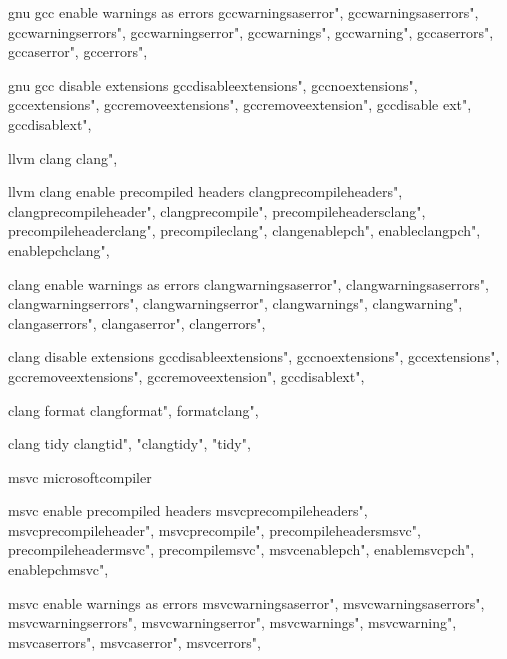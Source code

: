          gnu gcc enable warnings as errors
        gccwarningsaserror", 
        gccwarningsaserrors", 
        gccwarningserrors", 
        gccwarningserror", 
        gccwarnings", 
        gccwarning", 
        gccaserrors", 
        gccaserror", 
        gccerrors", 
        
         gnu gcc disable extensions 
        gccdisableextensions", 
        gccnoextensions", 
        gccextensions", 
        gccremoveextensions", 
        gccremoveextension", 
        gccdisable ext", 
        gccdisablext", 
        
         llvm clang 
        clang",  
        
         llvm clang enable precompiled headers 
        clangprecompileheaders",  
        clangprecompileheader",  
        clangprecompile",  
        precompileheadersclang",  
        precompileheaderclang",  
        precompileclang",  
        clangenablepch",  
        enableclangpch",  
        enablepchclang",  
        
         clang enable warnings as errors
        clangwarningsaserror", 
        clangwarningsaserrors", 
        clangwarningserrors", 
        clangwarningserror", 
        clangwarnings", 
        clangwarning", 
        clangaserrors", 
        clangaserror", 
        clangerrors", 
        
         clang disable extensions 
        gccdisableextensions", 
        gccnoextensions", 
        gccextensions", 
        gccremoveextensions", 
        gccremoveextension", 
        gccdisablext", 
        
         clang format 
        clangformat",
        formatclang",
        
         clang tidy 
        clangtid", "clangtidy", "tidy",  
        
         msvc  
         microsoftcompiler
        
         msvc enable precompiled headers 
        msvcprecompileheaders",  
        msvcprecompileheader",  
        msvcprecompile",  
        precompileheadersmsvc",  
        precompileheadermsvc",  
        precompilemsvc",  
        msvcenablepch",  
        enablemsvcpch",  
        enablepchmsvc",  
        
         msvc enable warnings as errors
        msvcwarningsaserror", 
        msvcwarningsaserrors", 
        msvcwarningserrors", 
        msvcwarningserror", 
        msvcwarnings", 
        msvcwarning", 
        msvcaserrors", 
        msvcaserror", 
        msvcerrors", 
        
